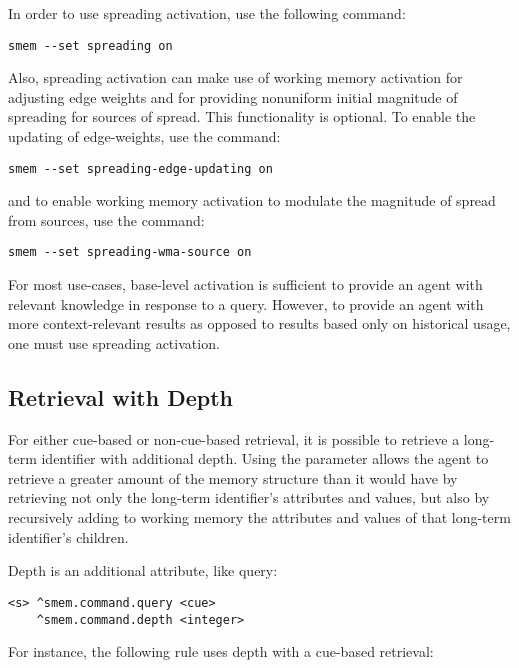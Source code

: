 In order to use spreading activation, use the following command:

\begin{verbatim}
smem --set spreading on
\end{verbatim}

Also, spreading activation can make use of working memory activation for adjusting edge weights and for providing nonuniform initial magnitude of spreading for sources of spread. This functionality is optional. To enable the updating of edge-weights, use the command: 

\begin{verbatim}
smem --set spreading-edge-updating on
\end{verbatim} 

and to enable working memory activation to modulate the magnitude of spread from sources, use the command: 

\begin{verbatim}
smem --set spreading-wma-source on
\end{verbatim}

For most use-cases, base-level activation is sufficient to provide an agent with relevant knowledge in response to a query. However, to provide an agent with more context-relevant results as opposed to results based only on historical usage, one must use spreading activation.

\subsection{Retrieval with Depth}

For either cue-based or non-cue-based retrieval, it is possible to retrieve a long-term identifier with additional depth. Using the  parameter allows the agent to retrieve a greater amount of the memory structure than it would have by retrieving not only the long-term identifier's attributes and values, but also by recursively adding to working memory the attributes and values of that long-term identifier's children.

Depth is an additional  attribute, like query:

\begin{verbatim}
<s> ^smem.command.query <cue>
    ^smem.command.depth <integer>
\end{verbatim}

For instance, the following rule uses depth with a cue-based retrieval:

